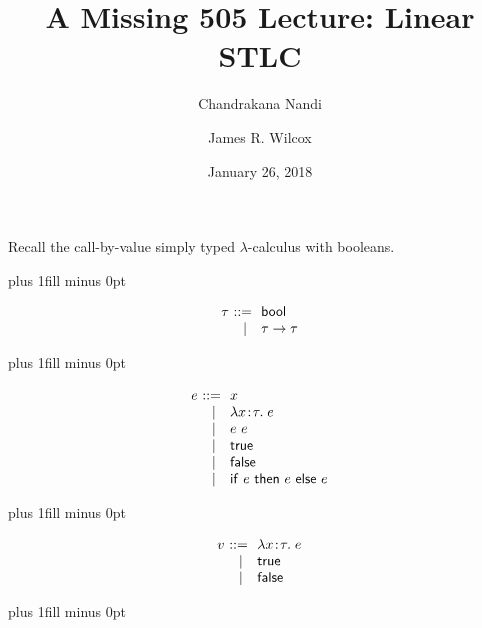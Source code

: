 \documentclass{article}
\title{A Missing 505 Lecture: Linear STLC}
\author{Chandrakana Nandi\and James R. Wilcox}
\date{January 26, 2018}
\newcommand{\bnfeq}{&::=&}
\newcommand{\bnfalt}{&~\mid&}
\newcommand{\bool}{\ensuremath{\mathsf{bool}}}
\newcommand{\true}{\ensuremath{\mathsf{true}}}
\newcommand{\false}{\ensuremath{\mathsf{false}}}
\newcommand{\IF}[3]{\ensuremath{\mathsf{if}\ #1\ \mathsf{then}\ #2\ \mathsf{else}\ #3}}
\newcommand{\Colon}{{\hspace{1pt}:\hspace{1pt}}}
\newcommand{\COLON}{\mathrel{\,:\,}}
\newcommand{\LAMBDA}[3]{\lambda #1\Colon#2.\; #3}
\newcommand{\hastype}[3]{\ensuremath{#1\mathrel{\,\vdash\,}#2 \COLON #3}}
\begin{document}
\maketitle

Recall the call-by-value simply typed $\lambda$-calculus with booleans.

{
\noindent
\hskip 1cm plus 1fill minus 0pt
\begin{varwidth}[t]{0.5\textwidth}
\[
\begin{array}{r@{~}c@{~~}l}
  \tau \bnfeq  \bool\\
       \bnfalt \tau\to\tau\\
\end{array}
\]
\end{varwidth}
\hskip 0pt plus 1fill minus 0pt
\begin{varwidth}[t]{0.5\textwidth}
\[
\begin{array}{r@{~}c@{~~}l}
  e \bnfeq     x \\
    \bnfalt    \LAMBDA{x}{\tau}{e}\\
    \bnfalt    e\ e \\
    \bnfalt    \true \\
    \bnfalt    \false \\
    \bnfalt    \IF{e}{e}{e}
\end{array}
\]
\end{varwidth}
\hskip -1cm plus 1fill minus 0pt
\begin{varwidth}[t]{0.5\textwidth}
\[
\begin{array}{r@{~}c@{~~}l}
  v \bnfeq     \LAMBDA{x}{\tau}{e}\\
    \bnfalt    \true \\
    \bnfalt    \false
\end{array}
\]
\end{varwidth}
\hskip 0pt plus 1fill minus 0pt
}

\vspace{1cm}

{
\def\MathparLineskip {\lineskiplimit=1.2em\lineskip=2.5em plus 0.2em}

{
\setlength{\fboxsep}{5pt}
\fbox{\hastype{\Gamma}{e}{\tau}}
}
}
\end{document}
